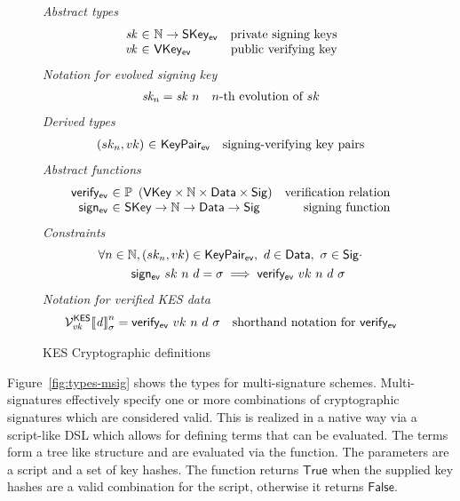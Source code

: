 \begin{figure}[htb]
  \emph{Abstract types}
  \begin{equation*}
    \begin{array}{r@{~\in~}lr}
      \var{sk} & \N \to \SKeyEv & \text{private signing keys}\\
      \var{vk} & \VKeyEv & \text{public verifying key}\\
    \end{array}
  \end{equation*}
  \emph{Notation for evolved signing key}
  \begin{align*}
    & \mathit{sk_n} = \mathit{sk}~n & n\text{-th evolution of }sk
  \end{align*}
  \emph{Derived types}
  \begin{equation*}
    \begin{array}{r@{~\in~}lr}
      (sk_n, vk) & \KeyPairEv & \text{signing-verifying key pairs}
    \end{array}
  \end{equation*}
  \emph{Abstract functions}
  \begin{equation*}
    \begin{array}{r@{~\in~}lr}
      \fun{verify_{ev}} & \powerset{\left(\VKey \times \N \times \Data \times \Sig\right)}
                        & \text{verification relation}\\
      \fun{sign_{ev}} & \SKey \to \N \to \Data \to \Sig
                      & \text{signing function}\\
    \end{array}
  \end{equation*}
  \emph{Constraints}
  \begin{align*}
    & \forall n\in\mathbb{N}, (sk_n, vk) \in \mathsf{KeyPair_{ev}}, ~ d \in \mathsf{Data},~ \sigma \in \mathsf{Sig} \cdot \\
    & ~~~~~~~~\mathsf{sign_{ev}} ~ sk ~ n ~ d = \sigma \implies \mathsf{verify_{ev}} ~ vk ~ n ~ d ~ \sigma
  \end{align*}
  \emph{Notation for verified KES data}
  \begin{align*}
    & \mathcal{V}^{\mathsf{KES}}_{\mathit{vk}}{\llbracket \mathit{d} \rrbracket}_{\sigma}^n
        = \mathsf{verify_{ev}} ~ vk ~ n ~ d ~ \sigma
    & \text{shorthand notation for } \mathsf{verify_{ev}}
  \end{align*}
  \caption{KES Cryptographic definitions}
  \label{fig:kes-defs-shelley}
\end{figure}

Figure~\ref{fig:types-msig} shows the types for multi-signature
schemes. Multi-signatures effectively specify one or more combinations of
cryptographic signatures which are considered valid. This is realized in a
native way via a script-like DSL which allows for defining terms that can be
evaluated. The terms form a tree like structure and are evaluated via the
 function. The parameters are a script and a set of key
hashes. The function returns $\mathsf{True}$ when the supplied key hashes are
a valid combination for the script, otherwise it returns $\mathsf{False}$.

